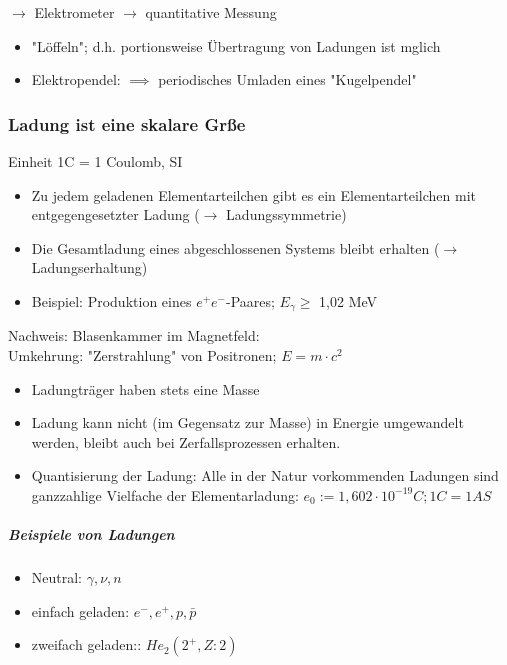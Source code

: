 \documentclass[11pt]{article}
\begin{document}
			$\rightarrow$ Elektrometer $\rightarrow$ quantitative Messung
			\begin{itemize}
				\item "L\"{o}ffeln"; d.h. portionsweise Übertragung von Ladungen ist mglich
				\item Elektropendel: $\implies$ periodisches Umladen eines "Kugelpendel"
			\end{itemize}
			
			\subsubsection{Ladung ist eine skalare Grße } Einheit 1C = 1 Coulomb, SI
				\begin{itemize}
					\item Zu jedem geladenen Elementarteilchen gibt es ein Elementarteilchen mit entgegengesetzter Ladung ($\rightarrow$ Ladungssymmetrie)
					\item Die Gesamtladung eines abgeschlossenen Systems bleibt erhalten ($\rightarrow$ Ladungserhaltung)
					\item Beispiel: Produktion eines $ e^+e^- $-Paares; $ E_\gamma \geq $ 1,02 MeV
				\end{itemize}
				
				\newpage
				
				\noindent Nachweis: Blasenkammer im Magnetfeld:  \hfill \\
				Umkehrung: "Zerstrahlung" von Positronen; $E=m\cdot c^2$
				\begin{itemize}
					\item Ladungtr\"{a}ger haben stets eine Masse
					\item Ladung kann nicht (im Gegensatz zur Masse) in Energie umgewandelt werden, bleibt auch bei Zerfallsprozessen erhalten.
					\item Quantisierung der Ladung: Alle in der Natur vorkommenden Ladungen sind ganzzahlige Vielfache der Elementarladung: $e_0:=1,602\cdot10^{-19}C; 1C=1AS$
				\end{itemize}
				\subparagraph{Beispiele von Ladungen}
				\begin{itemize}
					\item Neutral: $\gamma, \nu, n$
					\item einfach geladen: $e^-,e^+,p, \bar{p}$
					\item zweifach geladen:: $He_2(2^+,Z:2)$
				\end{itemize}	
				
\newpage
\end{document}
